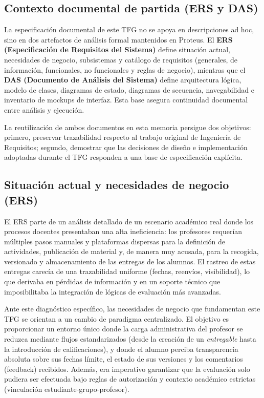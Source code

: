 \subsection{Contexto documental de partida (ERS y DAS)}

La especificaci\'on documental de este TFG no se apoya en descripciones ad hoc, sino en dos artefactos de an\'alisis formal mantenidos en Proteus. El \textbf{ERS (Especificaci\'on de Requisitos del Sistema)} define situaci\'on actual, necesidades de negocio, subsistemas y cat\'alogo de requisitos (generales, de informaci\'on, funcionales, no funcionales y reglas de negocio), mientras que el \textbf{DAS (Documento de An\'alisis del Sistema)} define arquitectura l\'ogica, modelo de clases, diagramas de estado, diagramas de secuencia, navegabilidad e inventario de mockups de interfaz. Esta base asegura continuidad documental entre an\'alisis y ejecuci\'on.

La reutilizaci\'on de ambos documentos en esta memoria persigue dos objetivos:
primero, preservar trazabilidad respecto al trabajo original de Ingenier\'ia
de Requisitos; segundo, demostrar que las decisiones de dise\~no e implementaci\'on
adoptadas durante el TFG responden a una base de especificaci\'on expl\'icita.

\subsection{Situaci\'on actual y necesidades de negocio (ERS)}

El ERS parte de un an\'alisis detallado de un escenario acad\'emico real donde los procesos docentes presentaban una alta ineficiencia: los profesores requer\'ian m\'ultiples pasos manuales y plataformas dispersas para la definici\'on de actividades, publicaci\'on de material y, de manera muy acusada, para la recogida, versionado y almacenamiento de las entregas de los alumnos. El rastreo de estas entregas carec\'ia de una trazabilidad uniforme (fechas, reenv\'ios, visibilidad), lo que derivaba en p\'erdidas de informaci\'on y en un soporte t\'ecnico que imposibilitaba la integraci\'on de l\'ogicas de evaluaci\'on m\'as avanzadas.

Ante este diagn\'ostico espec\'ifico, las necesidades de negocio que fundamentan este TFG se orientan a un cambio de paradigma centralizado. El objetivo es proporcionar un entorno \'unico donde la carga administrativa del profesor se reduzca mediante flujos estandarizados (desde la creaci\'on de un \emph{entregable} hasta la introducci\'on de calificaciones), y donde el alumno perciba transparencia absoluta sobre sus fechas l\'imite, el estado de sus versiones y los comentarios (feedback) recibidos. Adem\'as, era imperativo garantizar que la evaluaci\'on solo pudiera ser efectuada bajo reglas de autorizaci\'on y contexto acad\'emico estrictas (vinculaci\'on estudiante-grupo-profesor). 

